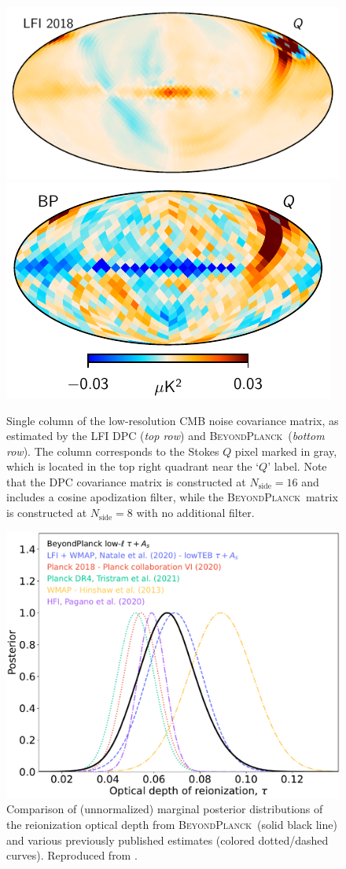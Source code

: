 \documentclass[onecolumn]{aa}
\newcommand{\BP}{\textsc{BeyondPlanck}}
\begin{document}
\begin{figure}[t]
  \center
  \includegraphics[width=0.5\linewidth]{figs/ncov_dpc_pix100_Q.pdf}
  \includegraphics[width=0.5\linewidth]{figs/ncov_pix100_BP10_Q.pdf}
  \caption{Single column of the low-resolution
    CMB noise covariance matrix, as estimated by the LFI DPC
    (\emph{top row}) and \BP\ (\emph{bottom row}). The column
    corresponds to the Stokes $Q$ pixel marked in gray, which is
    located in the top right quadrant near the `$Q$' label. Note that
    the DPC covariance matrix is constructed at $N_{\mathrm{side}}=16$
    and includes a cosine apodization filter, while the \BP\ matrix is
    constructed at $N_{\mathrm{side}}=8$ with no additional
    filter.}\label{fig:ncov}
\end{figure}


\begin{figure}[t]
  \center
  \includegraphics[width=0.5\linewidth]{figs/BP10_tau_post.pdf}
  \caption{Comparison of (unnormalized) marginal
    posterior distributions of the reionization optical depth from
    \BP\ (solid black line) and various previously published estimates
    (colored dotted/dashed curves). Reproduced from \citet{bp12}.}\label{fig:tau}
\end{figure}
\end{document}

